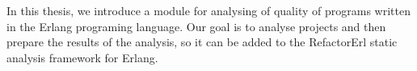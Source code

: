 

In this thesis, we introduce a module for analysing of quality of programs written in the Erlang programing language. Our goal is to analyse
projects and then prepare the results of the analysis, so it can be added to the RefactorErl static analysis framework for Erlang.